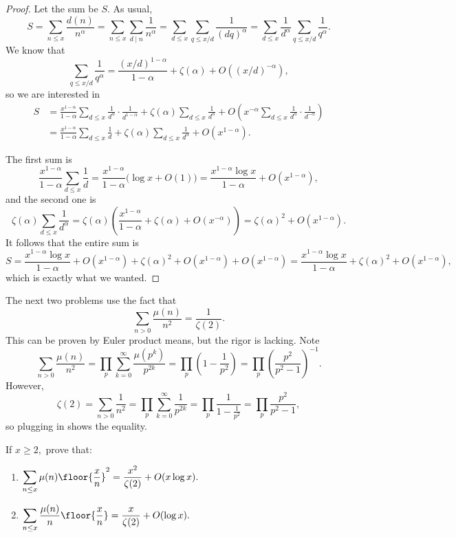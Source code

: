 \begin{proof}
Let the sum be $S.$ As usual,
\[S=\sum_{n\le x}\frac{d(n)}{n^\alpha}=\sum_{n\le x}\sum_{d\mid n}\frac1{n^{\alpha}}=\sum_{d\le x}\sum_{q\le x/d}\frac1{(dq)^\alpha}=\sum_{d\le x}\frac1{d^\alpha}\sum_{q\le x/d}\frac1{q^\alpha}.\]
We know that
\[\sum_{q\le x/d}\frac1{q^\alpha}=\frac{(x/d)^{1-\alpha}}{1-\alpha}+\zeta(\alpha)+O\left((x/d)^{-\alpha}\right),\]
so we are interested in
\begin{align*}
    S &= \frac{x^{1-\alpha}}{1-\alpha}\sum_{d\le x}\frac1{d^\alpha}\cdot\frac1{d^{1-\alpha}}+\zeta(\alpha)\sum_{d\le x}\frac1{d^\alpha}+O\left(x^{-\alpha}\sum_{d\le x}\frac1{d^\alpha}\cdot\frac1{d^{-\alpha}}\right) \\
    &= \frac{x^{1-\alpha}}{1-\alpha}\sum_{d\le x}\frac1d+\zeta(\alpha)\sum_{d\le x}\frac1{d^\alpha}+O\left(x^{1-\alpha}\right).
\end{align*}

The first sum is
\[\frac{x^{1-\alpha}}{1-\alpha}\sum_{d\le x}\frac1d=\frac{x^{1-\alpha}}{1-\alpha}\big(\log x+O(1)\big)=\frac{x^{1-\alpha}\log x}{1-\alpha}+O\left(x^{1-\alpha}\right),\]
and the second one is
\[\zeta(\alpha)\sum_{d\le x}\frac1{d^\alpha}=\zeta(\alpha)\left(\frac{x^{1-\alpha}}{1-\alpha}+\zeta(\alpha)+O\left(x^{-\alpha}\right)\right)=\zeta(\alpha)^2+O\left(x^{1-\alpha}\right).\]
It follows that the entire sum is
\[S = \frac{x^{1-\alpha}\log x}{1-\alpha}+O\left(x^{1-\alpha}\right)+\zeta(\alpha)^2+O\left(x^{1-\alpha}\right)+O\left(x^{1-\alpha}\right)=\frac{x^{1-\alpha}\log x}{1-\alpha}+\zeta(\alpha)^2+O\left(x^{1-\alpha}\right),\]
which is exactly what we wanted.
\end{proof}

The next two problems use the fact that
\[\sum_{n>0}\frac{\mu(n)}{n^2}=\frac1{\zeta(2)}.\]
This can be proven by Euler product means, but the rigor is lacking. Note
\[\sum_{n>0}\frac{\mu(n)}{n^2}=\prod_p\sum_{k=0}^\infty\frac{\mu\left(p^k\right)}{p^{2k}}=\prod_p\left(1-\frac1{p^2}\right)=\prod_p\left(\frac{p^2}{p^2-1}\right)^{-1}.\]
However,
\[\zeta(2)=\sum_{n>0}\frac1{n^2}=\prod_p\sum_{k=0}^\infty\frac1{p^{2k}}=\prod_p\frac1{1-\frac1{p^2}}=\prod_p\frac{p^2}{p^2-1},\]
so plugging in shows the equality.

\begin{exercise}
If $x\ge2,$ prove that:
\begin{enumerate}[label=(\alph*)]
    \item $\displaystyle\sum_{n\le x}\mu(n)\floor{\frac xn}^2=\frac{x^2}{\zeta(2)}+O(x\log x).$
    \item $\displaystyle\sum_{n\le x}\frac{\mu(n)}n\floor{\frac xn}=\frac x{\zeta(2)}+O(\log x).$
\end{enumerate}
\end{exercise}

